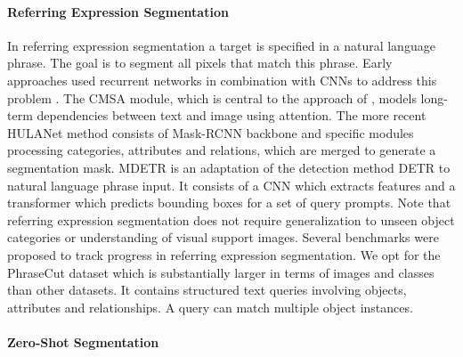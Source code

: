\documentclass[10pt,twocolumn,letterpaper]{article}
\begin{document}
\paragraph{Referring Expression Segmentation}

In referring expression segmentation a target is specified in a natural language phrase. The goal is to segment all pixels that match this phrase. Early approaches used recurrent networks in combination with CNNs to address this problem \cite{hu2016seg_nl, liu17refseg, shi18, li18referring}.
The CMSA module, which is central to the approach of \citet{ye19}, models long-term dependencies between text and image using attention.
The more recent HULANet method \cite{wu20phrasecut} consists of Mask-RCNN backbone and specific modules processing categories, attributes and relations, which are merged to generate a segmentation mask.
MDETR \cite{kamath21} is an adaptation of the detection method DETR \cite{carion20end} to natural language phrase input. It consists of a CNN which extracts features and a transformer which predicts bounding boxes for a set of query prompts. 
Note that referring expression segmentation does not require generalization to unseen object categories or understanding of visual support images.
Several benchmarks \cite{yu16modeling, mao16generation, wu20phrasecut} were proposed to track progress in referring expression segmentation. We opt for the PhraseCut dataset \cite{wu20phrasecut} which is substantially larger in terms of images and classes than other datasets. It contains structured text queries involving objects, attributes and relationships. A query can match multiple object instances.




\paragraph{Zero-Shot Segmentation}
\end{document}
